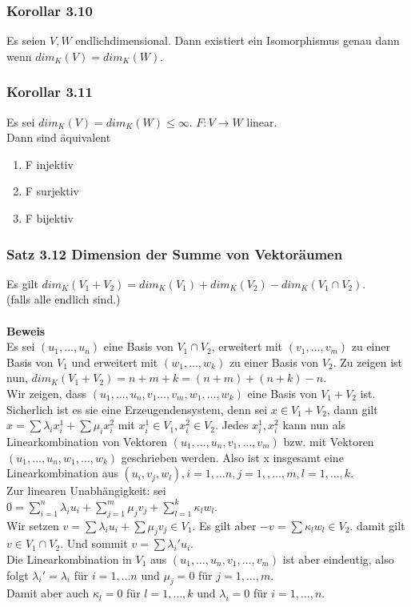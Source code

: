 \documentclass{scrartcl}
\newcommand{\lb}{\lambda}
\begin{document}
\subsubsection{Korollar 3.10}
Es seien \(V, W\) endlichdimensional. Dann existiert ein Isomorphismus genau dann wenn \(dim_K(V) = dim_K(W)\).

\subsubsection{Korollar 3.11}
Es sei \(dim_K(V) = dim_K(W) \le \infty\). \(F : V \to W\) linear.\\
Dann sind \"aquivalent
\begin{enumerate}
\item{F injektiv}
\item{F surjektiv}
\item{F bijektiv}
\end{enumerate}

\subsubsection{Satz 3.12 Dimension der Summe von Vektor\"aumen}
Es gilt \(dim_K(V_1 + V_2) = dim_K(V_1) + dim_K(V_2) - dim_K(V_1 \cap V_2)\).\\
(falls alle endlich sind.)\\
\\
\textbf{Beweis}\\
Es sei \((u_1, \dots, u_n)\) eine Basis von \(V_1 \cap V_2\), erweitert mit \((v_1, \dots, v_m)\) zu einer Basis von \(V_1\) und erweitert mit \((w_1, \dots, w_k)\) zu einer Basis von \(V_2\). Zu zeigen ist nun, \(dim_K(V_1 + V_2) = n + m + k = (n + m) + (n + k) - n\).\\
Wir zeigen, dass \((u_1, \dots, u_n, v_1 \dots, v_m, w_1, \dots, w_k)\) eine Basis von \(V_1 + V_2\) ist. Sicherlich ist es sie eine Erzeugendensystem, denn sei \(x \in V_1 + V_2\), dann gilt \(x = \sum \lb_i x^1_i + \sum \mu_i x^2_i\) mit \(x^1_i \in V_1, x^2_i \in V_2\). Jedes \(x_i^1, x_i^2\) kann nun als Linearkombination von Vektoren \((u_1, \dots, u_n, v_1, \dots, v_m)\) bzw. mit Vektoren \((u_1, \dots, u_n, w_1, \dots, w_k)\) geschrieben werden. Also ist x insgesamt eine Linearkombination aus \((u_i, v_j, w_l), i=1, \dots n, j = 1,, \dots, m, l = 1, \dots, k\).\\
Zur linearen Unabh\"angigkeit: sei\\
\(0 = \sum_{i=1}^n \lb_i u_i + \sum_{j=1}^m \mu_j v_j + \sum_{l = 1}^k \kappa_l w_l\).\\
Wir setzen \(v = \sum \lb_i u_i + \sum \mu_j v_j \in V_1\). Es gilt aber \(-v = \sum \kappa_l w_l \in V_2\). damit gilt \(v \in V_1 \cap V_2\). Und sommit \(v =\sum \lb_i' u_i\).\\
Die Linearkombination in \(V_1\) aus \((u_1, \dots, u_n, v_1, \dots, v_m)\) ist aber eindeutig, also folgt \(\lb_i' = \lb_i\) f\"ur \(i =  1, \dots n\) und \(\mu_j = 0\) f\"ur \(j = 1, \dots, m\).\\
Damit aber auch \(\kappa_l = 0\) f\"ur \(l = 1, \dots, k\) und \(\lb_i = 0\) f\"ur \(i = 1, \dots, n\).
\end{document}
